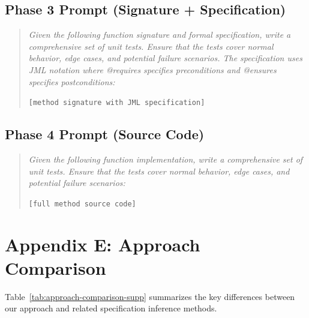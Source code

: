 \documentclass[11pt]{article}
\begin{document}
\subsection{Phase 3 Prompt (Signature + Specification)}
\begin{quote}
\textit{Given the following function signature and formal specification, write a comprehensive set of unit tests. Ensure that the tests cover normal behavior, edge cases, and potential failure scenarios. The specification uses JML notation where @requires specifies preconditions and @ensures specifies postconditions:}

\texttt{[method signature with JML specification]}
\end{quote}

\subsection{Phase 4 Prompt (Source Code)}
\begin{quote}
\textit{Given the following function implementation, write a comprehensive set of unit tests. Ensure that the tests cover normal behavior, edge cases, and potential failure scenarios:}

\texttt{[full method source code]}
\end{quote}

\section{Appendix E: Approach Comparison}
\label{app:comparison}

Table~\ref{tab:approach-comparison-supp} summarizes the key differences between our approach and related specification inference methods.
\end{document}
